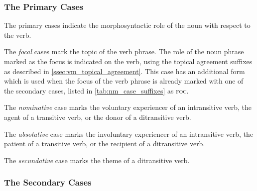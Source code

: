 \documentclass[grammar]{subfiles}
\begin{document}
  \subsubsection{The Primary Cases}
  \label{sssec:nm_primary_cases}

  The primary cases indicate the morphosyntactic role of the noun with respect to the verb.

  \label{nm_focal_case}

  The \emph{focal} cases mark the topic of the verb phrase.  The role of the
  noun phrase marked as the focus is indicated on the verb, using the topical
  agreement suffixes as described in \cref{ssec:vm_topical_agreement}.
  This case has an additional form which is used when the focus of the verb
  phrase is already marked with one of the secondary cases, listed in
  \cref{tab:nm_case_suffixes} as \textsc{foc}.

  \label{nm_nominative_case}

  The \emph{nominative} case marks the voluntary experiencer of an intransitive
  verb, the agent of a transitive verb, or the donor of a ditransitive verb.

  \label{nm_absolutive_case}

  The \emph{absolutive} case marks the involuntary experiencer of an
  intransitive verb, the patient of a transitive verb, or the recipient of a
  ditransitive verb.

  \label{nm_secundative_case}

  The \emph{secundative} case marks the theme of a ditransitive verb.

  \subsubsection{The Secondary Cases}
  \label{sssec:nm_secondary_cases}
\end{document}
